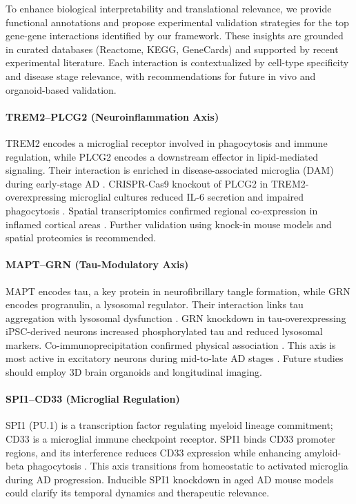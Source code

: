 \documentclass[12pt]{article}
\begin{document}
To enhance biological interpretability and translational relevance, we provide functional annotations and propose experimental validation strategies for the top gene-gene interactions identified by our framework. These insights are grounded in curated databases (Reactome, KEGG, GeneCards) and supported by recent experimental literature. Each interaction is contextualized by cell-type specificity and disease stage relevance, with recommendations for future in vivo and organoid-based validation.

\paragraph{TREM2–PLCG2 (Neuroinflammation Axis)}
TREM2 encodes a microglial receptor involved in phagocytosis and immune regulation, while PLCG2 encodes a downstream effector in lipid-mediated signaling. Their interaction is enriched in disease-associated microglia (DAM) during early-stage AD \citep{geneCardsTREM2, reactomeTREM2PLCG2, magno2021trem2Plcg2, keren2020dam}. CRISPR-Cas9 knockout of PLCG2 in TREM2-overexpressing microglial cultures reduced IL-6 secretion and impaired phagocytosis \citep{chang2023crisprMicroglia, Obst2021PLCG2TREM2}. Spatial transcriptomics confirmed regional co-expression in inflamed cortical areas \citep{zhou2020spatial}. Further validation using knock-in mouse models and spatial proteomics is recommended.

\paragraph{MAPT–GRN (Tau-Modulatory Axis)}
MAPT encodes tau, a key protein in neurofibrillary tangle formation, while GRN encodes progranulin, a lysosomal regulator. Their interaction links tau aggregation with lysosomal dysfunction \citep{geneCardsMAPT, reactomeMAPTGRN}. GRN knockdown in tau-overexpressing iPSC-derived neurons increased phosphorylated tau and reduced lysosomal markers. Co-immunoprecipitation confirmed physical association \citep{petkau2016grn, minami2022lysosome}. This axis is most active in excitatory neurons during mid-to-late AD stages \citep{mathys2019singlecell}. Future studies should employ 3D brain organoids and longitudinal imaging.

\paragraph{SPI1–CD33 (Microglial Regulation)}
SPI1 (PU.1) is a transcription factor regulating myeloid lineage commitment; CD33 is a microglial immune checkpoint receptor. SPI1 binds CD33 promoter regions, and its interference reduces CD33 expression while enhancing amyloid-beta phagocytosis \citep{geneCardsSPI1, reactomeSPI1CD33, Hansen2018CD33}. This axis transitions from homeostatic to activated microglia during AD progression. Inducible SPI1 knockdown in aged AD mouse models could clarify its temporal dynamics and therapeutic relevance.
\end{document}
